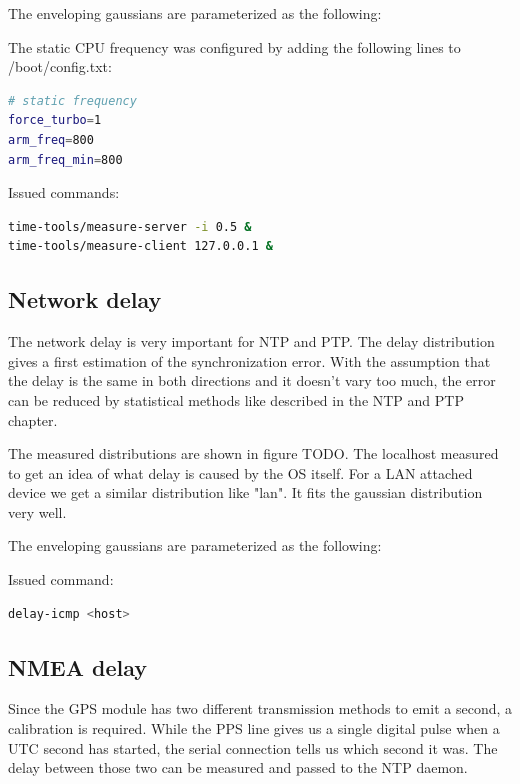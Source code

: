 The enveloping gaussians are parameterized as the following:


The static CPU frequency was configured by adding the following lines to /boot/config.txt:
\begin{lstlisting}[language=bash]
# static frequency
force_turbo=1
arm_freq=800
arm_freq_min=800
\end{lstlisting}

Issued commands:

\begin{lstlisting}[language=bash]
time-tools/measure-server -i 0.5 &
time-tools/measure-client 127.0.0.1 &
\end{lstlisting}

\subsection{Network delay}

The network delay is very important for NTP and PTP. The delay distribution gives a first estimation of the synchronization error. With the assumption that the delay is the same in both directions and it doesn’t vary too much, the error can be reduced by statistical methods like described in the NTP and PTP chapter.


The measured distributions are shown in figure TODO. The localhost measured to get an idea of what delay is caused by the OS itself. For a LAN attached device we get a similar distribution like "lan". It fits the gaussian distribution very well.

The enveloping gaussians are parameterized as the following:


Issued command:

\begin{lstlisting}[language=bash]
delay-icmp <host>
\end{lstlisting}

\subsection{NMEA delay}

Since the GPS module has two different transmission methods to emit a second, a calibration is required. While the PPS line gives us a single digital pulse when a UTC second has started, the serial connection tells us which second it was. The delay between those two can be measured and passed to the NTP daemon.

